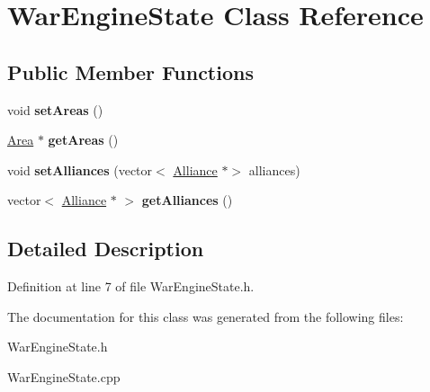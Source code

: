 \hypertarget{classWarEngineState}{}\section{War\+Engine\+State Class Reference}
\label{classWarEngineState}
\subsection*{Public Member Functions}
\begin{DoxyCompactItemize}
\item 
\mbox{\label{classWarEngineState_a47e4e33dc6a2f904f0598c361d3c06dd}} 
void {\bfseries set\+Areas} ()
\item 
\mbox{\label{classWarEngineState_a34eab6c0459c11fdfba7f8e04aad567a}} 
\hyperlink{classArea}{Area} $\ast$ {\bfseries get\+Areas} ()
\item 
\mbox{\label{classWarEngineState_ad7ec9ef65bbbf550b6566a54b7938136}} 
void {\bfseries set\+Alliances} (vector$<$ \hyperlink{classAlliance}{Alliance} $\ast$$>$ alliances)
\item 
\mbox{\label{classWarEngineState_aa88851d165886c80521e93c2d74338d5}} 
vector$<$ \hyperlink{classAlliance}{Alliance} $\ast$ $>$ {\bfseries get\+Alliances} ()
\end{DoxyCompactItemize}


\subsection{Detailed Description}


Definition at line 7 of file War\+Engine\+State.\+h.



The documentation for this class was generated from the following files\+:\begin{DoxyCompactItemize}
\item 
War\+Engine\+State.\+h\item 
War\+Engine\+State.\+cpp\end{DoxyCompactItemize}
